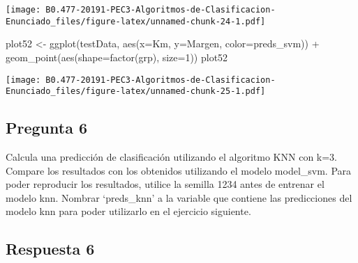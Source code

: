\documentclass[]{article}
\newenvironment{Shaded}{\begin{snugshade}}{\end{snugshade}}
\newcommand{\KeywordTok}[1]{\textcolor[rgb]{0.94,0.87,0.69}{#1}}
\newcommand{\DataTypeTok}[1]{\textcolor[rgb]{0.87,0.87,0.75}{#1}}
\newcommand{\DecValTok}[1]{\textcolor[rgb]{0.86,0.86,0.80}{#1}}
\newcommand{\StringTok}[1]{\textcolor[rgb]{0.80,0.58,0.58}{#1}}
\newcommand{\OperatorTok}[1]{\textcolor[rgb]{0.94,0.94,0.82}{#1}}
\newcommand{\NormalTok}[1]{\textcolor[rgb]{0.80,0.80,0.80}{#1}}
\begin{document}
\texttt{[image: B0.477-20191-PEC3-Algoritmos-de-Clasificacion-Enunciado\_files/figure-latex/unnamed-chunk-24-1.pdf]}

\begin{Shaded}
\begin{Highlighting}[]
\NormalTok{plot52 <-}\StringTok{ }\KeywordTok{ggplot}\NormalTok{(testData, }\KeywordTok{aes}\NormalTok{(}\DataTypeTok{x=}\NormalTok{Km, }\DataTypeTok{y=}\NormalTok{Margen, }\DataTypeTok{color=}\NormalTok{preds_svm)) }\OperatorTok{+}\StringTok{ }\KeywordTok{geom_point}\NormalTok{(}\KeywordTok{aes}\NormalTok{(}\DataTypeTok{shape=}\KeywordTok{factor}\NormalTok{(grp), }\DataTypeTok{size=}\DecValTok{1}\NormalTok{))}
\NormalTok{plot52}
\end{Highlighting}
\end{Shaded}

\texttt{[image: B0.477-20191-PEC3-Algoritmos-de-Clasificacion-Enunciado\_files/figure-latex/unnamed-chunk-25-1.pdf]}

\subsection{Pregunta 6}\label{pregunta-6}

Calcula una predicción de clasificación utilizando el algoritmo KNN con
k=3. Compare los resultados con los obtenidos utilizando el modelo
model\_svm. Para poder reproducir los resultados, utilice la semilla
1234 antes de entrenar el modelo knn. Nombrar `preds\_knn' a la variable
que contiene las predicciones del modelo knn para poder utilizarlo en el
ejercicio siguiente.

\subsection{Respuesta 6}\label{respuesta-6}

\begin{Shaded}
\end{Shaded}
\end{document}
